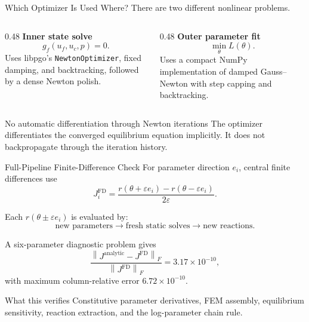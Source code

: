 \documentclass[aspectratio=169,10pt]{beamer}
\newcommand{\norm}[1]{\left\lVert #1\right\rVert}
\begin{document}
\begin{frame}{Which Optimizer Is Used Where?}
  \small
  There are two different nonlinear problems.

  \begin{columns}[T]
    \begin{column}{0.48\linewidth}
      \textbf{Inner state solve}
      \[
        g_f(u_f,u_c,p)=0.
      \]
      Uses libpgo's
      \texttt{NewtonOptimizer}, fixed damping, and backtracking, followed by
      a dense Newton polish.
    \end{column}
    \begin{column}{0.48\linewidth}
      \textbf{Outer parameter fit}
      \[
        \min_\theta L(\theta).
      \]
      Uses a compact NumPy implementation of damped Gauss--Newton with step
      capping and backtracking.
    \end{column}
  \end{columns}

  \vspace{0.8em}
  \begin{alertblock}{No automatic differentiation through Newton iterations}
    The optimizer differentiates the converged equilibrium equation
    implicitly. It does not backpropagate through the iteration history.
  \end{alertblock}
\end{frame}

\begin{frame}{Full-Pipeline Finite-Difference Check}
  \small
  For parameter direction $e_i$, central finite differences use
  \[
    J_i^{\mathrm{FD}}
    =
    \frac{
      r(\theta+\varepsilon e_i)
      -
      r(\theta-\varepsilon e_i)
    }{2\varepsilon}.
  \]

  Each $r(\theta\pm\varepsilon e_i)$ is evaluated by:
  \[
    \text{new parameters}
    \rightarrow
    \text{fresh static solves}
    \rightarrow
    \text{new reactions}.
  \]

  A six-parameter diagnostic problem gives
  \[
    \frac{\norm{J^{\mathrm{analytic}}-J^{\mathrm{FD}}}_F}
         {\norm{J^{\mathrm{FD}}}_F}
    =
    3.17\times10^{-10},
  \]
  with maximum column-relative error $6.72\times10^{-10}$.

  \begin{block}{What this verifies}
    Constitutive parameter derivatives, FEM assembly, equilibrium
    sensitivity, reaction extraction, and the log-parameter chain rule.
  \end{block}
\end{frame}
\end{document}
